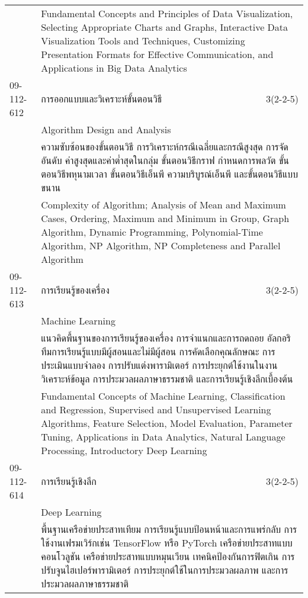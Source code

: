 \begin{longtable}{p{}p{}r{}}
&  \multicolumn{2}{p{0.75\textwidth}}{Fundamental Concepts and Principles of Data Visualization, Selecting Appropriate Charts and Graphs, Interactive Data Visualization Tools and Techniques, Customizing Presentation Formats for Effective Communication, and Applications in Big Data Analytics} \vspace{8mm} \\*
09-112-612 & การออกแบบและวิเคราะห์ขั้นตอนวิธี & 3(2-2-5)\\*
 & Algorithm Design and Analysis & \phantom{x} \vspace{3mm} \\*
&  \multicolumn{2}{p{0.75\textwidth}}{ความซับซ้อนของขั้นตอนวิธี การวิเคราะห์กรณีเฉลี่ยและกรณีสูงสุด การจัดอันดับ ค่าสูงสุดและค่าต่ำสุดในกลุ่ม ขั้นตอนวิธีกราฟ กำหนดการพลวัต ขั้นตอนวิธีพหุนามเวลา ขั้นตอนวิธีเอ็นพี ความบริบูรณ์เอ็นพี และขั้นตอนวิธีแบบขนาน} \vspace{3mm} \\*
&  \multicolumn{2}{p{0.75\textwidth}}{Complexity of Algorithm; Analysis of Mean and Maximum Cases, Ordering, Maximum and Minimum in Group, Graph Algorithm, Dynamic Programming, Polynomial-Time Algorithm, NP Algorithm, NP Completeness and Parallel Algorithm} \vspace{8mm} \\*
09-112-613 & การเรียนรู้ของเครื่อง & 3(2-2-5)\\*
 & Machine Learning & \phantom{x} \vspace{3mm} \\*
&  \multicolumn{2}{p{0.75\textwidth}}{แนวคิดพื้นฐานของการเรียนรู้ของเครื่อง การจำแนกและการถดถอย อัลกอริทึมการเรียนรู้แบบมีผู้สอนและไม่มีผู้สอน การคัดเลือกคุณลักษณะ การประเมินแบบจำลอง การปรับแต่งพารามิเตอร์ การประยุกต์ใช้งานในงานวิเคราะห์ข้อมูล การประมวลผลภาษาธรรมชาติ และการเรียนรู้เชิงลึกเบื้องต้น} \vspace{3mm} \\*
&  \multicolumn{2}{p{0.75\textwidth}}{Fundamental Concepts of Machine Learning, Classification and Regression, Supervised and Unsupervised Learning Algorithms, Feature Selection, Model Evaluation, Parameter Tuning, Applications in Data Analytics, Natural Language Processing, Introductory Deep Learning} \vspace{8mm} \\*
09-112-614 & การเรียนรู้เชิงลึก & 3(2-2-5)\\*
 & Deep Learning & \phantom{x} \vspace{3mm} \\*
&  \multicolumn{2}{p{0.75\textwidth}}{พื้นฐานเครือข่ายประสาทเทียม การเรียนรู้แบบป้อนหน้าและการแพร่กลับ การใช้งานเฟรมเวิร์กเช่น TensorFlow หรือ PyTorch เครือข่ายประสาทแบบคอนโวลูชัน เครือข่ายประสาทแบบหมุนเวียน เทคนิคป้องกันการฟิตเกิน การปรับจูนไฮเปอร์พารามิเตอร์ การประยุกต์ใช้ในการประมวลผลภาพ และการประมวลผลภาษาธรรมชาติ} \vspace{3mm} \\*

\end{longtable}
